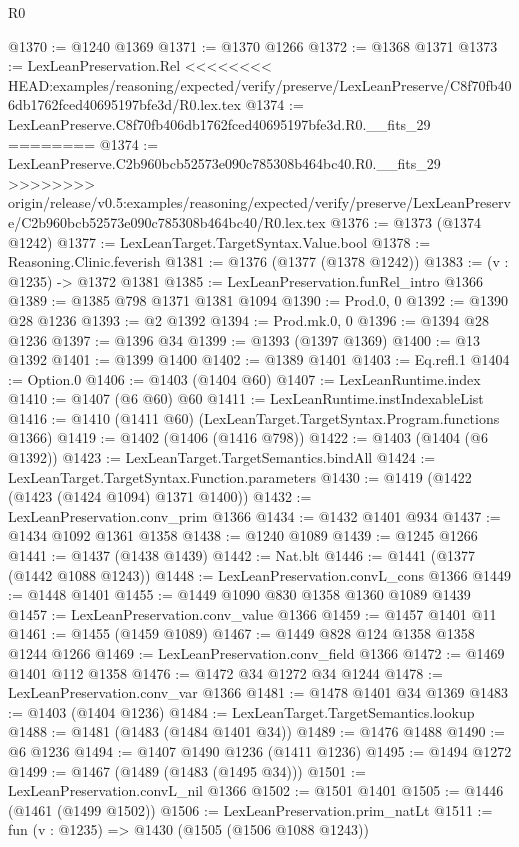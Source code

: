 \begin{lexlean}{R0}
\begin{coremodule}
{{{{{{{{{{{{{{{{{{{{{{{{{{{{{{{{{{{{{{{{{{{{{{{{{{{{{{{{{{{{{{{{{{{{{{{{{{{{{{{{{{{{{{@1370 := @1240 @1369
@1371 := @1370 @1266
@1372 := @1368 @1371
@1373 := LexLeanPreservation.Rel
<<<<<<<< HEAD:examples/reasoning/expected/verify/preserve/LexLeanPreserve/C8f70fb406db1762fced40695197bfe3d/R0.lex.tex
@1374 := LexLeanPreserve.C8f70fb406db1762fced40695197bfe3d.R0.__fits_29
========
@1374 := LexLeanPreserve.C2b960bcb52573e090c785308b464bc40.R0.__fits_29
>>>>>>>> origin/release/v0.5:examples/reasoning/expected/verify/preserve/LexLeanPreserve/C2b960bcb52573e090c785308b464bc40/R0.lex.tex
@1376 := @1373 (@1374 @1242)
@1377 := LexLeanTarget.TargetSyntax.Value.bool
@1378 := Reasoning.Clinic.feverish
@1381 := @1376 (@1377 (@1378 @1242))
@1383 := (v : @1235) -> @1372 @1381
@1385 := LexLeanPreservation.funRel_intro @1366
@1389 := @1385 @798 @1371 @1381 @1094
@1390 := Prod.{0, 0}
@1392 := @1390 @28 @1236
@1393 := @2 @1392
@1394 := Prod.mk.{0, 0}
@1396 := @1394 @28 @1236
@1397 := @1396 @34
@1399 := @1393 (@1397 @1369)
@1400 := @13 @1392
@1401 := @1399 @1400
@1402 := @1389 @1401
@1403 := Eq.refl.{1}
@1404 := Option.{0}
@1406 := @1403 (@1404 @60)
@1407 := LexLeanRuntime.index
@1410 := @1407 (@6 @60) @60
@1411 := LexLeanRuntime.instIndexableList
@1416 := @1410 (@1411 @60) (LexLeanTarget.TargetSyntax.Program.functions @1366)
@1419 := @1402 (@1406 (@1416 @798))
@1422 := @1403 (@1404 (@6 @1392))
@1423 := LexLeanTarget.TargetSemantics.bindAll
@1424 := LexLeanTarget.TargetSyntax.Function.parameters
@1430 := @1419 (@1422 (@1423 (@1424 @1094) @1371 @1400))
@1432 := LexLeanPreservation.conv_prim @1366
@1434 := @1432 @1401 @934
@1437 := @1434 @1092 @1361 @1358
@1438 := @1240 @1089
@1439 := @1245 @1266
@1441 := @1437 (@1438 @1439)
@1442 := Nat.blt
@1446 := @1441 (@1377 (@1442 @1088 @1243))
@1448 := LexLeanPreservation.convL_cons @1366
@1449 := @1448 @1401
@1455 := @1449 @1090 @830 @1358 @1360 @1089 @1439
@1457 := LexLeanPreservation.conv_value @1366
@1459 := @1457 @1401 @11
@1461 := @1455 (@1459 @1089)
@1467 := @1449 @828 @124 @1358 @1358 @1244 @1266
@1469 := LexLeanPreservation.conv_field @1366
@1472 := @1469 @1401 @112 @1358
@1476 := @1472 @34 @1272 @34 @1244
@1478 := LexLeanPreservation.conv_var @1366
@1481 := @1478 @1401 @34 @1369
@1483 := @1403 (@1404 @1236)
@1484 := LexLeanTarget.TargetSemantics.lookup
@1488 := @1481 (@1483 (@1484 @1401 @34))
@1489 := @1476 @1488
@1490 := @6 @1236
@1494 := @1407 @1490 @1236 (@1411 @1236)
@1495 := @1494 @1272
@1499 := @1467 (@1489 (@1483 (@1495 @34)))
@1501 := LexLeanPreservation.convL_nil @1366
@1502 := @1501 @1401
@1505 := @1446 (@1461 (@1499 @1502))
@1506 := LexLeanPreservation.prim_natLt
@1511 := fun (v : @1235) => @1430 (@1505 (@1506 @1088 @1243))
}}}}}}}}}}}}}}}}}}}}}}}}}}}}}}}}}}}}}}}}}}}}}}}}}}}}}}}}}}}}}}}}}}}}}}}}}}}}}}}}}}}}}}
\end{coremodule}
\end{lexlean}
